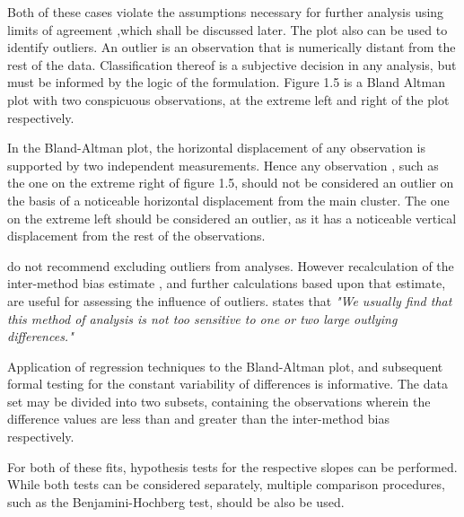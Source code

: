 \documentclass[Main.tex]{subfiles}
\begin{document}
Both of these cases violate the assumptions
	necessary for further analysis using limits of agreement ,which
	shall be discussed later. The plot also can be used to identify
	outliers. An outlier is an observation that is numerically distant
	from the rest of the data. Classification thereof is a subjective
	decision in any analysis, but must be informed by the logic of the
	formulation. Figure 1.5 is a Bland Altman plot with two
	conspicuous observations, at the extreme left and right of the
	plot respectively.
	
	
	
	In the Bland-Altman plot, the horizontal displacement of any
	observation is supported by two independent measurements. Hence
	any observation , such as the one on the extreme right of figure
	1.5, should not be considered an outlier on the basis of a
	noticeable horizontal displacement from the main cluster. The one
	on the extreme left should be considered an outlier, as it has a
	noticeable vertical displacement from the rest of the
	observations.
	
	\citet*{BA99} do not recommend excluding outliers from analyses.
	However recalculation of the inter-method bias estimate , and
	further calculations based upon that estimate, are useful for
	assessing the influence of outliers.\citep{BA99} states that
	\emph{"We usually find that this method of analysis is not too
		sensitive to one or two large outlying differences."}

	Application of regression techniques to the Bland-Altman 
	plot, and subsequent formal testing for the constant variability of differences is informative. The data set may be divided into two subsets, containing the observations wherein the difference values are less than and greater than the inter-method bias respectively.
	

	For both of these fits, hypothesis tests for the respective slopes
	can be performed. While both tests can be considered separately,
	multiple comparison procedures, such as the Benjamini-Hochberg
	\citep{BH} test, should be also be used.
	
\end{document}
